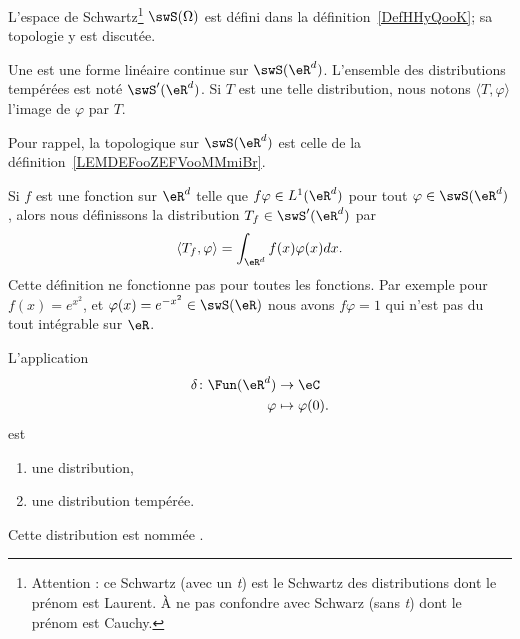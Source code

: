 L'espace de Schwartz\footnote{Attention : ce Schwartz (avec un \emph{t}) est le Schwartz des distributions dont le prénom est Laurent. À ne pas confondre avec Schwarz (sans \emph{t}) dont le prénom est Cauchy.} \( \swS(\Omega)\) est défini dans la définition~\ref{DefHHyQooK}; sa topologie y est discutée.
\begin{definition}
    Une  est une forme linéaire continue sur \( \swS(\eR^d)\). L'ensemble des distributions tempérées est noté \( \swS'(\eR^d)\). Si \( T\) est une telle distribution, nous notons $\langle T, \varphi\rangle$ l'image de \( \varphi\) par \( T\).
\end{definition}

\begin{normaltext}
    Pour rappel, la topologique sur \( \swS(\eR^d)\) est celle de la définition~\ref{LEMDEFooZEFVooMMmiBr}.
\end{normaltext}

Si \( f\) est une fonction sur \( \eR^d\) telle que \( f\varphi\in L^1(\eR^d)\) pour tout \( \varphi\in \swS(\eR^d)\), alors nous définissons la distribution \( T_f\in\swS'(\eR^d)\) par
\begin{equation}
    \langle T_f, \varphi\rangle =\int_{\eR^d}f(x)\varphi(x)dx.
\end{equation}
Cette définition ne fonctionne pas pour toutes les fonctions. Par exemple pour \( f(x)= e^{x^2}\), et \( \varphi(x)= e^{-x^2}\in\swS(\eR)\) nous avons \( f\varphi=1\) qui n'est pas du tout intégrable sur \( \eR\).

\begin{lemmaDef}      \label{DEFooUSTNooYEZfPN}
    L'application
    \begin{equation}
        \begin{aligned}
            \delta\colon \Fun(\eR^d)&\to \eC \\
            \varphi&\mapsto \varphi(0).
        \end{aligned}
    \end{equation}
    est
    \begin{enumerate}
        \item
            une distribution,
        \item
            une distribution tempérée.
    \end{enumerate}
    Cette distribution est nommée .
\end{lemmaDef}

